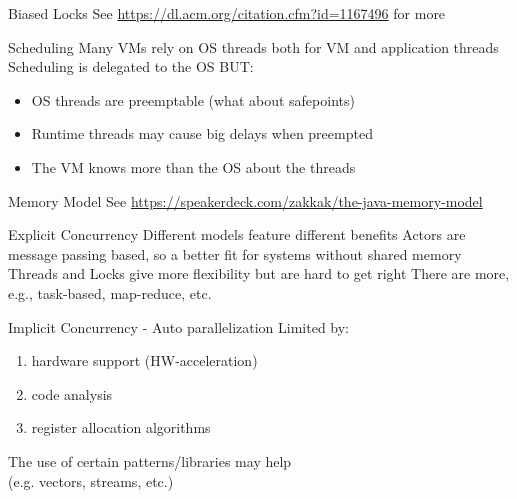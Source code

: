 \documentclass[
14pt,
aspectratio=169,
usenames,
dvipsnames,
x11names]{beamer}
\newcommand{\tik}[0]{{\color{YellowGreen}\Checkmark}} %
\newcommand{\ex}[0]{{\color{BrickRed}\XSolidBrush}}  %
\begin{document}
\begin{frame}{Biased Locks}
  \centering
  See \url{https://dl.acm.org/citation.cfm?id=1167496} for more
\end{frame}

\begin{frame}{Scheduling}
  Many VMs rely on OS threads both for VM and application threads
  \vfill
  Scheduling is delegated to the OS \tik
  \vfill
  BUT: \ex
  \begin{itemize}
  \item OS threads are preemptable (what about safepoints)
  \item Runtime threads may cause big delays when preempted
  \item The VM knows more than the OS about the threads
  \end{itemize}
  \vfill
\end{frame}

\begin{frame}{Memory Model}
  See \url{https://speakerdeck.com/zakkak/the-java-memory-model}
\end{frame}

\begin{frame}{Explicit Concurrency}
  Different models feature different benefits
  \vfill
  Actors are message passing based, so a better fit for systems without shared memory
  \vfill
  Threads and Locks give more flexibility but are hard to get right
  \vfill
  There are more, e.g., task-based, map-reduce, etc.
\end{frame}

\begin{frame}{Implicit Concurrency - Auto parallelization}
  Limited by:
  \begin{enumerate}
  \item hardware support (HW-acceleration)
  \item code analysis
  \item register allocation algorithms
  \end{enumerate}
  \vfill
  The use of certain patterns/libraries may help\\
  (e.g. vectors, streams, etc.)
\end{frame}


\end{document}

